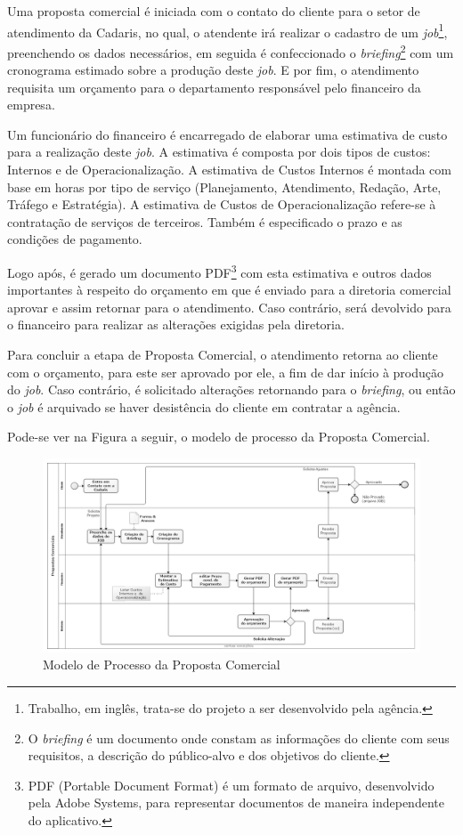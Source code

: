 \documentclass[
  12pt,				%
  openany,
  oneside,
  a4paper,			%
  english,			%
  brazil
]{article}
\numberwithin{figure}{section}
\numberwithin{table}{section}
\begin{document}
Uma proposta comercial é iniciada com o contato do cliente para o setor de atendimento da Cadaris, no qual, o atendente irá realizar o cadastro de um \textit{job}\footnote{Trabalho, em inglês, trata-se do projeto a ser desenvolvido pela agência.}, preenchendo os dados necessários, em seguida é confeccionado o \textit{briefing}\footnote{O \textit{briefing} é um documento onde constam as informações do cliente com seus requisitos, a descrição do público-alvo e dos objetivos do cliente.} com um cronograma estimado sobre a produção deste \textit{job}. E por fim, o atendimento requisita um orçamento para o departamento responsável pelo financeiro da empresa. 

Um funcionário do financeiro é encarregado de elaborar uma estimativa de custo para a realização deste \textit{job}. A estimativa é composta por dois tipos de custos: Internos e de Operacionalização. A estimativa de Custos Internos é montada com base em horas por tipo de serviço (Planejamento, Atendimento, Redação, Arte, Tráfego e Estratégia). A estimativa de Custos de Operacionalização refere-se à contratação de serviços de terceiros. Também é especificado o prazo e as condições de pagamento.

Logo após, é gerado um documento PDF\footnote{PDF (Portable Document Format) é um formato de arquivo, desenvolvido pela Adobe Systems, para representar documentos de maneira independente do aplicativo.} com esta estimativa e outros dados importantes à respeito do orçamento em que é enviado para a diretoria comercial aprovar e assim retornar para o atendimento. Caso contrário, será devolvido para o financeiro para realizar as alterações exigidas pela diretoria. 

Para concluir a etapa de Proposta Comercial, o atendimento retorna ao cliente com o orçamento, para este ser aprovado por ele, a fim de dar início à produção do \textit{job}. Caso contrário, é solicitado alterações retornando para o \textit{briefing}, ou então o \textit{job} é arquivado se haver desistência do cliente em contratar a agência.

Pode-se ver na Figura a seguir, o modelo de processo da Proposta Comercial.

\begin{figure}[h]
  \centering
  \includegraphics[width=\linewidth]{ModeloProcesso_Comercial_PeB}
  \caption{Modelo de Processo da Proposta Comercial}
  \label{fig:modProcess}
\end{figure}
\end{document}
